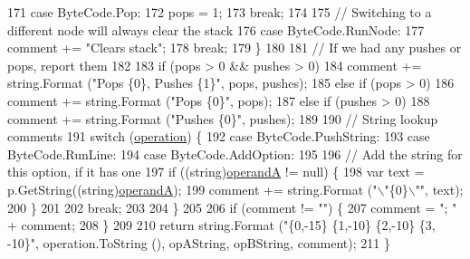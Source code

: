 \begin{DoxyCode}
171             \textcolor{keywordflow}{case} ByteCode.Pop:
172                 pops = 1;
173                 \textcolor{keywordflow}{break};
174             
175             \textcolor{comment}{// Switching to a different node will always clear the stack}
176             \textcolor{keywordflow}{case} ByteCode.RunNode:
177                 comment += \textcolor{stringliteral}{"Clears stack"};
178                 \textcolor{keywordflow}{break};
179             \}
180 
181             \textcolor{comment}{// If we had any pushes or pops, report them}
182 
183             \textcolor{keywordflow}{if} (pops > 0 && pushes > 0)
184                 comment += string.Format (\textcolor{stringliteral}{"Pops \{0\}, Pushes \{1\}"}, pops, pushes);
185             \textcolor{keywordflow}{else} \textcolor{keywordflow}{if} (pops > 0)
186                 comment += string.Format (\textcolor{stringliteral}{"Pops \{0\}"}, pops);
187             \textcolor{keywordflow}{else} \textcolor{keywordflow}{if} (pushes > 0)
188                 comment += string.Format (\textcolor{stringliteral}{"Pushes \{0\}"}, pushes);
189 
190             \textcolor{comment}{// String lookup comments}
191             \textcolor{keywordflow}{switch} (\hyperlink{a00044_a566bf5f7198cc353ea5c3710cb3a31cb}{operation}) \{
192             \textcolor{keywordflow}{case} ByteCode.PushString:
193             \textcolor{keywordflow}{case} ByteCode.RunLine:
194             \textcolor{keywordflow}{case} ByteCode.AddOption:
195 
196                 \textcolor{comment}{// Add the string for this option, if it has one}
197                 \textcolor{keywordflow}{if} ((\textcolor{keywordtype}{string})\hyperlink{a00044_ab5d386faa0d3dbc23db80f8e62706afd}{operandA} != null) \{
198                     var text = p.GetString((string)\hyperlink{a00044_ab5d386faa0d3dbc23db80f8e62706afd}{operandA});
199                     comment += string.Format (\textcolor{stringliteral}{"\(\backslash\)"\{0\}\(\backslash\)""}, text);
200                 \}
201 
202                 \textcolor{keywordflow}{break};
203             
204             \}
205 
206             \textcolor{keywordflow}{if} (comment != \textcolor{stringliteral}{""}) \{
207                 comment = \textcolor{stringliteral}{"; "} + comment;
208             \}
209 
210             \textcolor{keywordflow}{return} string.Format (\textcolor{stringliteral}{"\{0,-15\} \{1,-10\} \{2,-10\} \{3, -10\}"}, operation.ToString (), opAString, 
      opBString, comment);
211         \}
\end{DoxyCode}


